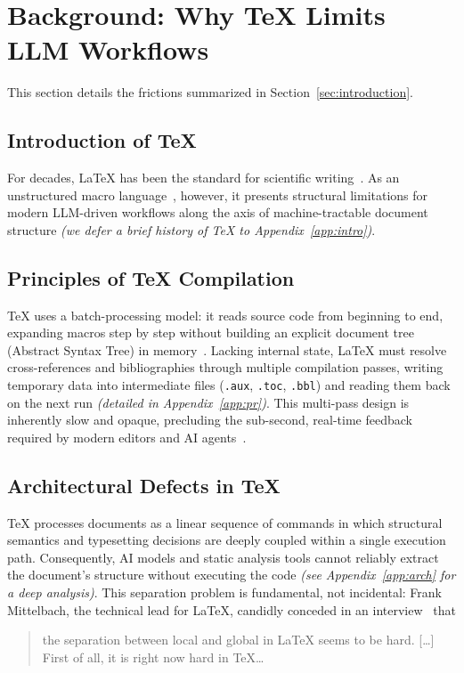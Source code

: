 \section{Background: Why {\TeX} Limits LLM Workflows}
\label{sec:background}

This section details the frictions summarized in Section~\ref{sec:introduction}.

\subsection{Introduction of {\TeX}}

For decades, {\LaTeX} has been the standard for scientific writing~\cite{lamport1994document}. As an unstructured macro language~\cite{van_der_hoeven_jolly_2020}, however, it presents structural limitations for modern LLM-driven workflows along the axis of machine-tractable document structure \emph{(we defer a brief history of {\TeX} to Appendix~\ref{app:intro})}.

\subsection{Principles of {\TeX} Compilation}

{\TeX} uses a batch-processing model: it reads source code from beginning to end, expanding macros step by step without building an explicit document tree (Abstract Syntax Tree) in memory~\cite{van_der_hoeven_gnu_2001}. Lacking internal state, {\LaTeX} must resolve cross-references and bibliographies through multiple compilation passes, writing temporary data into intermediate files (\texttt{.aux}, \texttt{.toc}, \texttt{.bbl}) and reading them back on the next run \emph{(detailed in Appendix~\ref{app:pr})}. This multi-pass design is inherently slow and opaque, precluding the sub-second, real-time feedback required by modern editors and AI agents~\cite{madje2023typst}.

\subsection{Architectural Defects in {\TeX}}

{\TeX} processes documents as a linear sequence of commands in which structural semantics and typesetting decisions are deeply coupled within a single execution path. Consequently, AI models and static analysis tools cannot reliably extract the document's structure without executing the code \emph{(see Appendix~\ref{app:arch} for a deep analysis)}. This separation problem is fundamental, not incidental: Frank Mittelbach, the technical lead for {\LaTeX}, candidly conceded in an interview~\cite{interview2021} that
\begin{quote}
the separation between local and global in {\LaTeX} seems to be hard. [\ldots] First of all, it is right now hard in {\TeX}\ldots
\end{quote}

